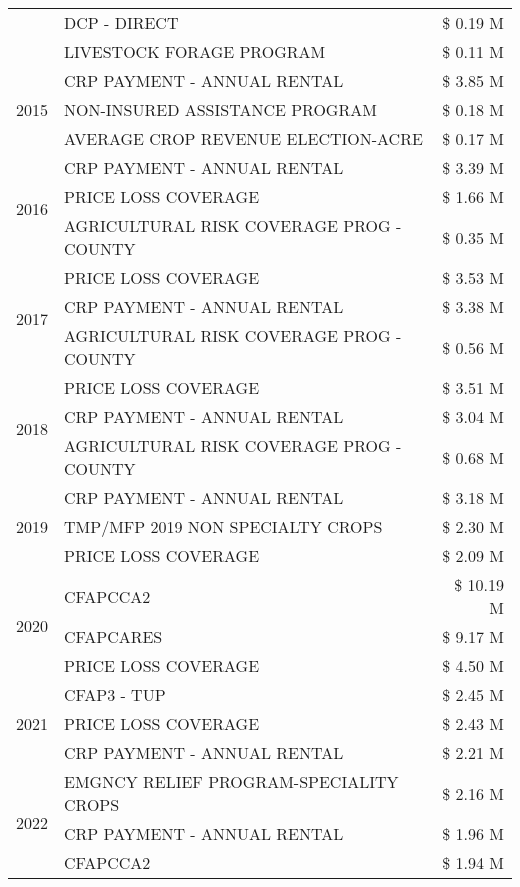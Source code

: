 \begin{tabular}{llr}
 & DCP - DIRECT & \$ 0.19 M \\
 & LIVESTOCK FORAGE PROGRAM & \$ 0.11 M \\
\cline{1-3}
\multirow[t]{3}{*}{2015} & CRP PAYMENT - ANNUAL RENTAL & \$ 3.85 M \\
 & NON-INSURED ASSISTANCE PROGRAM & \$ 0.18 M \\
 & AVERAGE CROP REVENUE ELECTION-ACRE & \$ 0.17 M \\
\cline{1-3}
\multirow[t]{3}{*}{2016} & CRP PAYMENT - ANNUAL RENTAL & \$ 3.39 M \\
 & PRICE LOSS COVERAGE & \$ 1.66 M \\
 & AGRICULTURAL RISK COVERAGE PROG - COUNTY & \$ 0.35 M \\
\cline{1-3}
\multirow[t]{3}{*}{2017} & PRICE LOSS COVERAGE & \$ 3.53 M \\
 & CRP PAYMENT - ANNUAL RENTAL & \$ 3.38 M \\
 & AGRICULTURAL RISK COVERAGE PROG - COUNTY & \$ 0.56 M \\
\cline{1-3}
\multirow[t]{3}{*}{2018} & PRICE LOSS COVERAGE & \$ 3.51 M \\
 & CRP PAYMENT - ANNUAL RENTAL & \$ 3.04 M \\
 & AGRICULTURAL RISK COVERAGE PROG - COUNTY & \$ 0.68 M \\
\cline{1-3}
\multirow[t]{3}{*}{2019} & CRP PAYMENT - ANNUAL RENTAL & \$ 3.18 M \\
 & TMP/MFP 2019 NON SPECIALTY CROPS & \$ 2.30 M \\
 & PRICE LOSS COVERAGE & \$ 2.09 M \\
\cline{1-3}
\multirow[t]{3}{*}{2020} & CFAPCCA2 & \$ 10.19 M \\
 & CFAPCARES & \$ 9.17 M \\
 & PRICE LOSS COVERAGE & \$ 4.50 M \\
\cline{1-3}
\multirow[t]{3}{*}{2021} & CFAP3 - TUP & \$ 2.45 M \\
 & PRICE LOSS COVERAGE & \$ 2.43 M \\
 & CRP PAYMENT - ANNUAL RENTAL & \$ 2.21 M \\
\cline{1-3}
\multirow[t]{3}{*}{2022} & EMGNCY RELIEF PROGRAM-SPECIALITY CROPS & \$ 2.16 M \\
 & CRP PAYMENT - ANNUAL RENTAL & \$ 1.96 M \\
 & CFAPCCA2 & \$ 1.94 M \\
\cline{1-3}
\bottomrule
\end{tabular}
